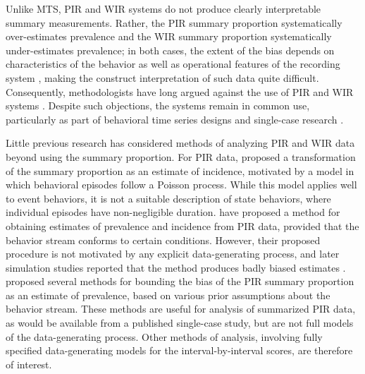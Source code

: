 \documentclass[man, noextraspace, floatsintext]{apa6}\usepackage[]{graphicx}\usepackage[]{color}
\begin{document}
Unlike MTS, PIR and WIR systems do not produce clearly interpretable summary measurements. 
Rather, the PIR summary proportion systematically over-estimates prevalence and the WIR summary proportion systematically under-estimates prevalence; in both cases, the extent of the bias depends on characteristics of the behavior as well as operational features of the recording system \citep{Kraemer1979one, Rogosa1991statistical}, making the construct interpretation of such data quite difficult. 
Consequently, methodologists have long argued against the use of PIR and WIR systems \citep[cf.]{Altmann1974observational, Mann1991time, Lane2014using}. 
Despite such objections, the systems remain in common use, particularly as part of behavioral time series designs and single-case research \citep{Rapp2007interval, Mudford2009continuous, Lane2014using}. 

Little previous research has considered methods of analyzing PIR and WIR data beyond using the summary proportion.
For PIR data, \citet{Altmann1970estimating} proposed a transformation of the summary proportion as an estimate of incidence, motivated by a model in which behavioral episodes follow a Poisson process. While this model applies well to event behaviors, it is not a suitable description of state behaviors, where individual episodes have non-negligible duration. 
\citet{Suen1986post, Suen1989analyzing} have proposed a method for obtaining estimates of prevalence and incidence from PIR data, provided that the behavior stream conforms to certain conditions. 
However, their proposed procedure is not motivated by any explicit data-generating process, and later simulation studies reported that the method produces badly biased estimates \citep[sec. 5.2]{Rogosa1991statistical}. 
\citet{Pustejovsky2014four} proposed several methods for bounding the bias of the PIR summary proportion as an estimate of prevalence, based on various prior assumptions about the behavior stream. 
These methods are useful for analysis of summarized PIR data, as would be available from a published single-case study, but are not full models of the data-generating process.
Other methods of analysis, involving fully specified data-generating models for the interval-by-interval scores, are therefore of interest.
\end{document}
